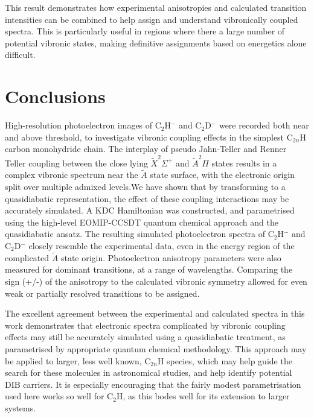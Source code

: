 \documentclass[journal=jpcafh,manuscript=article,layout=onecolumn, 12pt]{achemso}
\begin{document}
This result demonstrates how experimental anisotropies and calculated transition intensities can be combined to help assign and understand vibronically coupled spectra. This is particularly useful in regions where there a large number of potential vibronic states, making definitive assignments based on energetics alone difficult.


 
\section{Conclusions} 
High-resolution photoelectron images of C$_2$H$^-$ and C$_2$D$^-$ were recorded both near and above threshold, to investigate vibronic coupling effects in the simplest C$_{2n}$H carbon monohydride chain. The interplay of pseudo Jahn-Teller and Renner Teller coupling between the close lying $\tilde{X}^2\Sigma^+$ and $\tilde{A}^2\Pi$ states results in a complex vibronic spectrum near the $\tilde{A}$ state surface, with the electronic origin split over multiple admixed levels.We have shown that by transforming to a quasidiabatic representation, the effect of these coupling interactions may be accurately simulated. A KDC Hamiltonian was constructed, and parametrised using the high-level EOMIP-CCSDT quantum chemical approach and the quasidiabatic ansatz. The resulting simulated photoelectron spectra of C$_2$H$^-$ and C$_2$D$^-$ closely resemble the experimental data, even in the energy region of the complicated $\tilde{A}$ state origin. Photoelectron anisotropy parameters were also measured for dominant transitions, at a range of wavelengths. Comparing the sign (+/-) of the anisotropy to the calculated vibronic symmetry allowed for even weak or partially resolved transitions to be assigned.

The excellent agreement between the experimental and calculated spectra in this work
demonstrates that electronic spectra complicated by vibronic coupling effects may still be accurately simulated using a quasidiabatic treatment, as parametrised by appropriate quantum chemical methodology. This approach may be applied to larger, less well known, C$_{2n}$H species, which may help guide the search for these molecules in astronomical studies, and help identify potential DIB carriers. It is especially encouraging that the fairly modest parametrisation used here works so well for C$_2$H, as this bodes well for its extension to larger systems.
 
\end{document}
